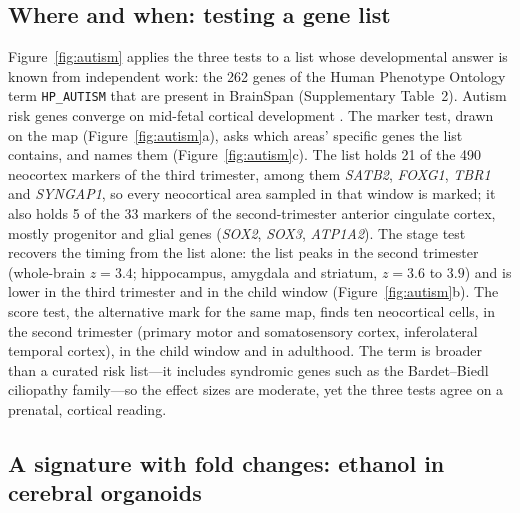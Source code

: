\documentclass[pdflatex,sn-basic]{sn-jnl}
\begin{document}
\subsection{Where and when: testing a gene list}\label{sec:showcase}

Figure~\ref{fig:autism} applies the three tests to a list whose developmental
answer is known from independent work: the 262 genes of the Human Phenotype
Ontology term \texttt{HP\_AUTISM} that are present in BrainSpan (Supplementary
Table~2). Autism risk
genes converge on mid-fetal cortical development
\citep{Willsey2013,Parikshak2013}. The marker test, drawn on the map
(Figure~\ref{fig:autism}a), asks which areas' specific genes the list contains,
and names them (Figure~\ref{fig:autism}c). The list holds 21 of the 490
neocortex markers of the third trimester, among them \emph{SATB2},
\emph{FOXG1}, \emph{TBR1} and \emph{SYNGAP1}, so every neocortical area sampled
in that window is marked; it also holds 5 of the 33 markers of the
second-trimester anterior cingulate cortex, mostly progenitor and glial genes
(\emph{SOX2}, \emph{SOX3}, \emph{ATP1A2}). The stage test recovers the timing
from the list alone: the list peaks in the second trimester (whole-brain
$z = 3.4$; hippocampus, amygdala and striatum, $z = 3.6$ to $3.9$) and is lower
in the third trimester and in the child window (Figure~\ref{fig:autism}b). The score
test, the alternative mark for the same map, finds ten neocortical cells, in the
second trimester (primary motor and somatosensory cortex, inferolateral temporal
cortex), in the child window and in adulthood. The term is broader than a curated risk
list---it includes syndromic genes such as the Bardet--Biedl ciliopathy
family---so the effect sizes are moderate, yet the three tests agree on a
prenatal, cortical reading.

\subsection{A signature with fold changes: ethanol in cerebral organoids}\label{sec:organoid}
\end{document}
